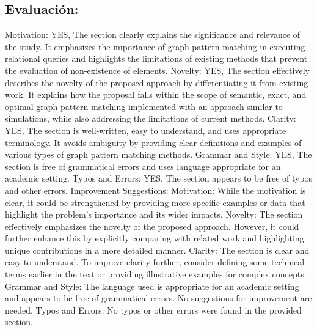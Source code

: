 \documentclass{article}%
\begin{document}
%
\subsection{Evaluación:}%
\label{subsec:Evaluacin}%
Motivation: YES, The section clearly explains the significance and relevance of the study. It emphasizes the importance of graph pattern matching in executing relational queries and highlights the limitations of existing methods that prevent the evaluation of non{-}existence of elements.\newline%
\newline%
Novelty: YES, The section effectively describes the novelty of the proposed approach by differentiating it from existing work. It explains how the proposal falls within the scope of semantic, exact, and optimal graph pattern matching implemented with an approach similar to simulations, while also addressing the limitations of current methods.\newline%
\newline%
Clarity: YES, The section is well{-}written, easy to understand, and uses appropriate terminology. It avoids ambiguity by providing clear definitions and examples of various types of graph pattern matching methods.\newline%
\newline%
Grammar and Style: YES, The section is free of grammatical errors and uses language appropriate for an academic setting.\newline%
\newline%
Typos and Errors: YES, The section appears to be free of typos and other errors.\newline%
\newline%
Improvement Suggestions:\newline%
\newline%
Motivation: While the motivation is clear, it could be strengthened by providing more specific examples or data that highlight the problem's importance and its wider impacts.\newline%
\newline%
Novelty: The section effectively emphasizes the novelty of the proposed approach. However, it could further enhance this by explicitly comparing with related work and highlighting unique contributions in a more detailed manner.\newline%
\newline%
Clarity: The section is clear and easy to understand. To improve clarity further, consider defining some technical terms earlier in the text or providing illustrative examples for complex concepts.\newline%
\newline%
Grammar and Style: The language used is appropriate for an academic setting and appears to be free of grammatical errors. No suggestions for improvement are needed.\newline%
\newline%
Typos and Errors: No typos or other errors were found in the provided section.
\end{document}
